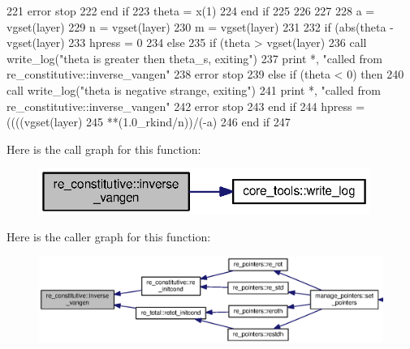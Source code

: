 \begin{DoxyCode}
221           error stop
222 \textcolor{keywordflow}{        end if}
223         theta = x(1)
224 \textcolor{keywordflow}{      end if}
225       
226       
227       
228       a = vgset(layer)%
229       n = vgset(layer)%
230       m = vgset(layer)%
231       
232       \textcolor{keywordflow}{if} (abs(theta - vgset(layer)%
233         hpress = 0
234       \textcolor{keywordflow}{else}
235         \textcolor{keywordflow}{if} (theta >  vgset(layer)%
236           \textcolor{keyword}{call }write_log(\textcolor{stringliteral}{"theta is greater then theta\_s, exiting"})
237           print *, \textcolor{stringliteral}{"called from re\_constitutive::inverse\_vangen"}
238           error stop
239         \textcolor{keywordflow}{else} \textcolor{keywordflow}{if} (theta < 0) \textcolor{keywordflow}{then}
240           \textcolor{keyword}{call }write_log(\textcolor{stringliteral}{"theta is negative strange, exiting"})
241           print *, \textcolor{stringliteral}{"called from re\_constitutive::inverse\_vangen"}
242           error stop 
243 \textcolor{keywordflow}{        end if}
244         hpress = ((((vgset(layer)%
245 \textcolor{comment}{        **(1.0\_rkind/n))/(-a)}
246 \textcolor{comment}{}\textcolor{keywordflow}{      end if}
247       
\end{DoxyCode}


Here is the call graph for this function\+:\nopagebreak
\begin{figure}[H]
\begin{center}
\leavevmode
\includegraphics[width=305pt]{namespacere__constitutive_a6cc0f4bc06a19ad696d83967878a54fb_cgraph}
\end{center}
\end{figure}




Here is the caller graph for this function\+:\nopagebreak
\begin{figure}[H]
\begin{center}
\leavevmode
\includegraphics[width=350pt]{namespacere__constitutive_a6cc0f4bc06a19ad696d83967878a54fb_icgraph}
\end{center}
\end{figure}



